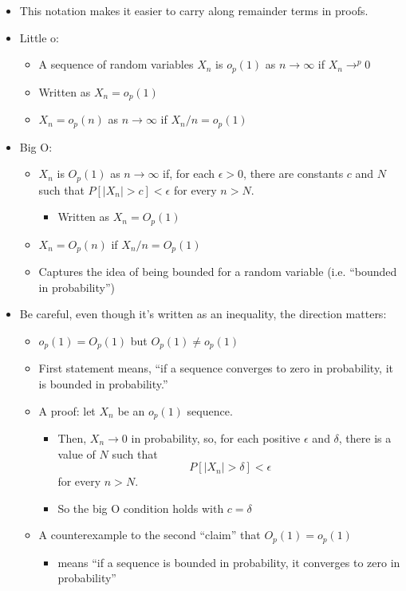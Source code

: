 \documentclass[11pt]{article}
\begin{document}
\begin{itemize}
\item This notation makes it easier to carry along remainder terms in
       proofs.
\item Little o:
\begin{itemize}
\item A sequence of random variables $X_n$ is $o_p(1)$ as $n \to
         \infty$ if $X_n \to^p 0$
\item Written as $X_n = o_p(1)$
\item $X_n = o_p(n)$ as $n \to \infty$ if $X_n/n = o_p(1)$
\end{itemize}
\item Big O:
\begin{itemize}
\item $X_n$ is $O_p(1)$ as $n \to \infty$ if, for each $\epsilon >
         0$, there are constants $c$ and $N$ such that $P[|X_n| > c] < \epsilon$ for every $n > N$.
\begin{itemize}
\item Written as $X_n = O_p(1)$
\end{itemize}
\item $X_n = O_p(n)$ if $X_n/n = O_p(1)$
\item Captures the idea of being bounded for a random variable
         (i.e. ``bounded in probability'')
\end{itemize}
\item Be careful, even though it's written as an inequality, the direction matters:
\begin{itemize}
\item $o_p(1) = O_p(1)$ but $O_p(1) \neq o_p(1)$
\item First statement means, ``if a sequence converges to zero in
         probability, it is bounded in probability.''
\item A proof: let $X_n$ be an $o_p(1)$ sequence.
\begin{itemize}
\item Then, $X_n \to 0$ in probability, so, for each positive
           $\epsilon$ and $\delta$, there is a value of $N$ such that
           \[P[|X_n| > \delta] < \epsilon\] for every $n > N$.
\item So the big O condition holds with $c = \delta$
\end{itemize}
\item A counterexample to the second ``claim'' that $O_p(1) = o_p(1)$
\begin{itemize}
\item means ``if a sequence is bounded in probability, it converges to zero in probability''

\end{itemize}
\end{itemize}
\end{itemize}
\end{document}
